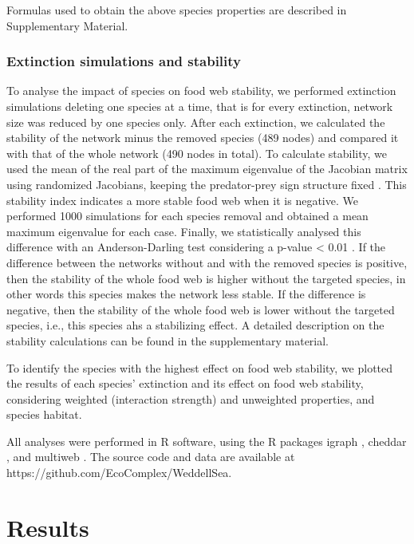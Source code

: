\documentclass[gc, manuscript]{copernicus}
\begin{document}
Formulas used to obtain the above species properties are described in
Supplementary Material.

\subsubsection{Extinction simulations and stability}

To analyse the impact of species on food web stability, we performed
extinction simulations deleting one species at a time, that is for every
extinction, network size was reduced by one species only. After each
extinction, we calculated the stability of the network minus the removed
species (489 nodes) and compared it with that of the whole network (490
nodes in total). To calculate stability, we used the mean of the real
part of the maximum eigenvalue of the Jacobian matrix using randomized
Jacobians, keeping the predator-prey sign structure fixed
\citep{Allesina2008, Grilli2016}. This stability index indicates a more
stable food web when it is negative. We performed 1000 simulations for
each species removal and obtained a mean maximum eigenvalue for each
case. Finally, we statistically analysed this difference with an
Anderson-Darling test considering a p-value \textless{} 0.01
\citep{Scholz1987}. If the difference between the networks without and
with the removed species is positive, then the stability of the whole
food web is higher without the targeted species, in other words this
species makes the network less stable. If the difference is negative,
then the stability of the whole food web is lower without the targeted
species, i.e., this species ahs a stabilizing effect. A detailed
description on the stability calculations can be found in the
supplementary material.

To identify the species with the highest effect on food web stability,
we plotted the results of each species' extinction and its effect on
food web stability, considering weighted (interaction strength) and
unweighted properties, and species habitat.

All analyses were performed in R software, using the R packages igraph
\citep{Csardi2005}, cheddar \citep{Hudson2013}, and multiweb
\citep{Saravia2019}. The source code and data are available at
https://github.com/EcoComplex/WeddellSea.

\section{Results}
\end{document}
